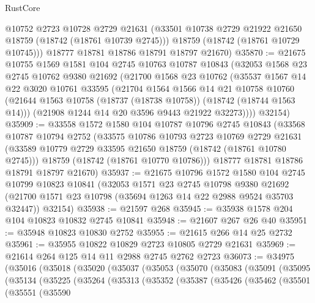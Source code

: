 \begin{lexlean}{RustCore}
\begin{coremodule}
        @10752
        @2723
        @10728
        @2729
        @21631
        (@33501 @10738 @2729 @21922 @21650 @18759 (@18742 (@18761 @10739 @2745)))
        @18759
        (@18742 (@18761 @10729 @10745)))
      @18777
      @18781
      @18786
      @18791
      @18797
      @21670)
@35870 := @21675
    @10755
    @1569
    @1581
    @104
    @2745
    @10763
    @10787
    @10843
    (@32053
      @1568
      @23
      @2745
      @10762
      @9380
      @21692
      (@21700
        @1568
        @23
        @10762
        (@35537
          @1567
          @14
          @22
          @3020
          @10761
          @33595
          (@21704
            @1564
            @1566
            @14
            @21
            @10758
            @10760
            (@21644 @1563 @10758 (@18737 (@18738 @10758)) (@18742 (@18744 @1563 @14)))
            (@21908 @1244 @14 @20 @3596 @9443 @21922 @32273))))
      @32154)
@35909 := @33558
    @1572
    @1580
    @104
    @10787
    @10796
    @2745
    @10843
    (@33568
      @10787
      @10794
      @2752
      (@33575
        @10786
        @10793
        @2723
        @10769
        @2729
        @21631
        (@33589 @10779 @2729 @33595 @21650 @18759 (@18742 (@18761 @10780 @2745)))
        @18759
        (@18742 (@18761 @10770 @10786)))
      @18777
      @18781
      @18786
      @18791
      @18797
      @21670)
@35937 := @21675
    @10796
    @1572
    @1580
    @104
    @2745
    @10799
    @10823
    @10841
    (@32053
      @1571
      @23
      @2745
      @10798
      @9380
      @21692
      (@21700 @1571 @23 @10798 (@35694 @1263 @14 @22 @2988 @9524 @35703 @32447))
      @32154)
@35938 := @21597 @268
@35945 := @35938 @1578 @204 @104 @10823 @10832 @2745 @10841
@35948 := @21607 @267 @26 @40
@35951 := @35948 @10823 @10830 @2752
@35955 := @21615 @266 @14 @25 @2732
@35961 := @35955 @10822 @10829 @2723 @10805 @2729 @21631
@35969 := @21614 @264 @125 @14 @11 @2988 @2745 @2762 @2723
@36073 := @34975
    (@35016
      (@35018
        (@35020
          (@35037
            (@35053
              (@35070
                (@35083
                  (@35091
                    (@35095
                      (@35134
                        (@35225
                          (@35264
                            (@35313
                              (@35352
                                (@35387
                                  (@35426
                                    (@35462
                                      (@35501
                                        (@35551
                                          (@35590

\end{coremodule}
\end{lexlean}
